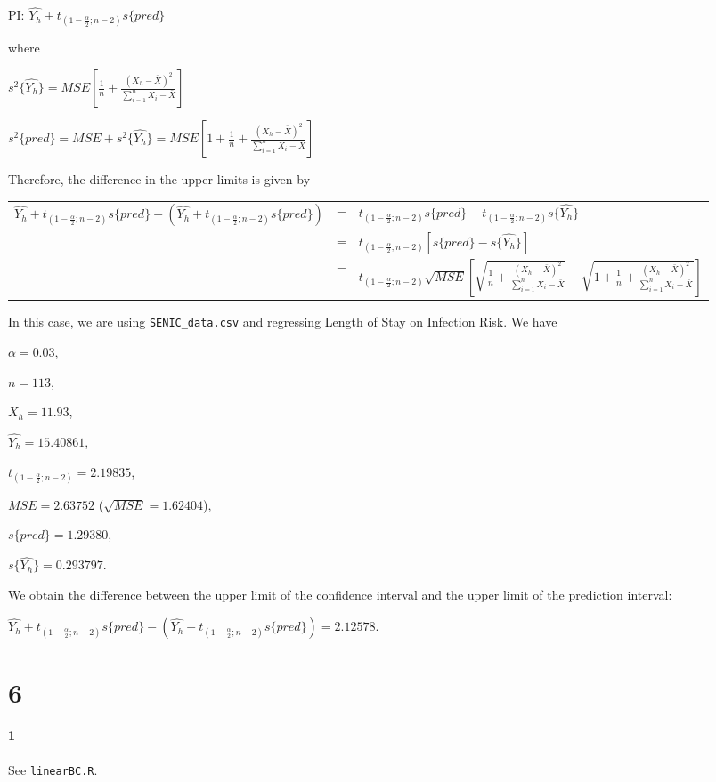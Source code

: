 \documentclass[]{article}
\let\oldparagraph\paragraph
\renewcommand{\paragraph}[1]{\oldparagraph{#1}\mbox{}}
\begin{document}
PI: $\hat{Y_h} \pm t_{(1-\frac{\alpha}{2}; n-2)}s\{pred\}$

where 

$s^2\{\hat{Y_h}\} = MSE[\frac{1}{n} + \frac{(X_h - \bar{X})^2}{\sum^n_{i=1}{X_i - \bar{X}}}]$

$s^2\{pred\} = MSE + s^2\{\hat{Y_h}\} = MSE[1 + \frac{1}{n} + \frac{(X_h - \bar{X})^2}{\sum^n_{i=1}{X_i - \bar{X}}}]$

Therefore, the difference in the upper limits is given by


\begin{adjustbox}{width=1.1\linewidth,totalheight=4in, center}
\begin{tabular}{rcl}
$\hat{Y_h} + t_{(1-\frac{\alpha}{2}; n-2)}s\{pred\} - (\hat{Y_h} + t_{(1-\frac{\alpha}{2}; n-2)}s\{pred\})$ & = & $t_{(1-\frac{\alpha}{2}; n-2)}s\{pred\} - t_{(1-\frac{\alpha}{2}; n-2)}s\{\hat{Y_h}\}$ \\
& = & $t_{(1-\frac{\alpha}{2}; n-2)}[s\{pred\} - s\{\hat{Y_h}\}]$ \\
& = & $t_{(1-\frac{\alpha}{2}; n-2)} \sqrt{MSE} [\sqrt{\frac{1}{n} + \frac{(X_h - \bar{X})^2}{\sum^n_{i=1}{X_i - \bar{X}}}} - \sqrt{1 + \frac{1}{n} + \frac{(X_h - \bar{X})^2}{\sum^n_{i=1}{X_i - \bar{X}}}}]$
\end{tabular}
\end{adjustbox}

In this case, we are using \texttt{SENIC\_data.csv} and regressing Length of Stay on Infection Risk. We have

$\alpha = 0.03$,

$n = 113$,

$X_h = 11.93$,

$\hat{Y_h} = 15.40861$,

$t_{(1-\frac{\alpha}{2}; n-2)} = 2.19835$,

$MSE = 2.63752$ ($\sqrt{MSE} = 1.62404$),

$s\{pred\} = 1.29380$,

$s\{\hat{Y_h}\} = 0.293797$.

We obtain the difference between the upper limit of the confidence interval and the upper limit of the prediction interval:

$\hat{Y_h} + t_{(1-\frac{\alpha}{2}; n-2)}s\{pred\} - (\hat{Y_h} + t_{(1-\frac{\alpha}{2}; n-2)}s\{pred\}) = 2.12578$.

\section*{6}
\paragraph{1}
See \texttt{linearBC.R}.
\end{document}
